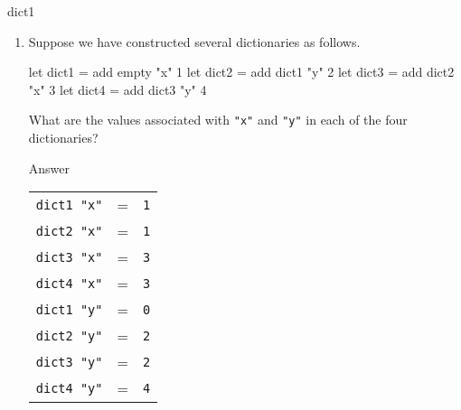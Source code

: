 \begin{exercise}{dict1}
\begin{enumerate}
\item
%
Suppose we have constructed several dictionaries as follows.

\begin{ocaml}
let dict1 = add empty "x" 1
let dict2 = add dict1 "y" 2
let dict3 = add dict2 "x" 3
let dict4 = add dict3 "y" 4
\end{ocaml}

What are the values associated with \hbox{\lstinline/"x"/} and \hbox{\lstinline/"y"/} in each of the four dictionaries?

\begin{answer}\ifanswers
Answer
\begin{center}
\begin{tabular}{rcl}
\hbox{\lstinline/dict1 "x"/} & = & \hbox{\lstinline/1/}\\
\hbox{\lstinline/dict2 "x"/} & = & \hbox{\lstinline/1/}\\
\hbox{\lstinline/dict3 "x"/} & = & \hbox{\lstinline/3/}\\
\hbox{\lstinline/dict4 "x"/} & = & \hbox{\lstinline/3/}\\
\hbox{\lstinline/dict1 "y"/} & = & \hbox{\lstinline/0/}\\
\hbox{\lstinline/dict2 "y"/} & = & \hbox{\lstinline/2/}\\
\hbox{\lstinline/dict3 "y"/} & = & \hbox{\lstinline/2/}\\
\hbox{\lstinline/dict4 "y"/} & = & \hbox{\lstinline/4/}
\end{tabular}
\end{center}
\fi\end{answer}
\end{enumerate}
\end{exercise}

